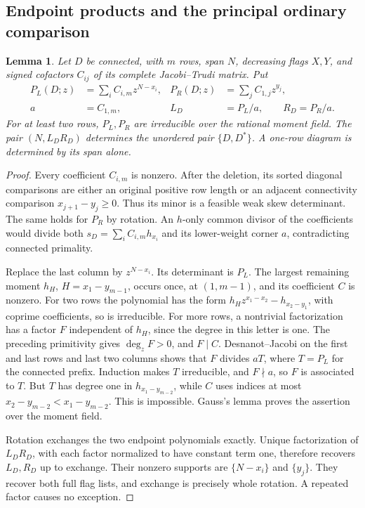 \documentclass[11pt,a4paper]{amsart}
\numberwithin{equation}{section}
\theoremstyle{plain}
\newtheorem{lemma}[theorem]{Lemma}
\theoremstyle{definition}
\begin{document}
\subsection{Endpoint products and the principal ordinary comparison}

\begin{lemma}\label{rt:endpoint-product}
Let \(D\) be connected, with \(m\) rows, span \(N\), decreasing flags \(X,Y\), and
signed cofactors \(C_{ij}\) of its complete Jacobi--Trudi matrix.  Put
\begin{align*}
 P_L(D;z)&=\sum_i C_{i,m}z^{N-x_i},
 &P_R(D;z)&=\sum_j C_{1,j}z^{y_j},\\
 a&=C_{1,m},
 &L_D&=P_L/a,\qquad R_D=P_R/a.
\end{align*}
For at least two rows, \(P_L,P_R\) are irreducible over the rational
moment field.  The pair \((N,L_DR_D)\) determines the unordered pair
\(\{D,D^*\}\).  A one-row diagram is determined by its span alone.
\end{lemma}
\begin{proof}
Every coefficient \(C_{i,m}\) is nonzero.  After the deletion, its sorted
diagonal comparisons are either an original positive row length or an
adjacent connectivity comparison \(x_{j+1}-y_j\ge0\).  Thus its minor
is a feasible weak skew determinant.  The same holds for \(P_R\) by
rotation.  An \(h\)-only common divisor of the coefficients would divide
both \(s_D=\sum_i C_{i,m}h_{x_i}\) and its lower-weight corner \(a\),
contradicting connected primality.

Replace the last column by \(z^{N-x_i}\).  Its determinant is \(P_L\).
The largest remaining moment \(h_H\), \(H=x_1-y_{m-1}\), occurs once,
at \((1,m-1)\), and its coefficient \(C\) is nonzero.  For two rows
the polynomial has the form \(h_H z^{x_1-x_2}-h_{x_2-y_1}\), with
coprime coefficients, so is irreducible.  For more rows, a nontrivial
factorization has a factor \(F\) independent of \(h_H\), since the
degree in this letter is one.  The preceding primitivity gives
\(\deg_zF>0\), and \(F\mid C\).  Desnanot--Jacobi on the first and
last rows and last two columns shows that \(F\) divides \(aT\), where
\(T=P_L\) for the connected prefix.  Induction makes \(T\) irreducible,
and \(F\nmid a\), so \(F\) is associated to \(T\).  But \(T\) has
degree one in \(h_{x_1-y_{m-2}}\), while \(C\) uses indices at most
\(x_2-y_{m-2}<x_1-y_{m-2}\).  This is impossible.
Gauss's lemma proves the assertion over the moment field.

Rotation exchanges the two endpoint polynomials exactly.
Unique factorization of \(L_DR_D\), with each factor normalized to have
constant term one, therefore recovers \(L_D,R_D\) up to exchange.
Their nonzero supports are \(\{N-x_i\}\) and \(\{y_j\}\).
They recover both full flag lists, and exchange is precisely whole
rotation.  A repeated factor causes no exception.
\end{proof}
\end{document}
